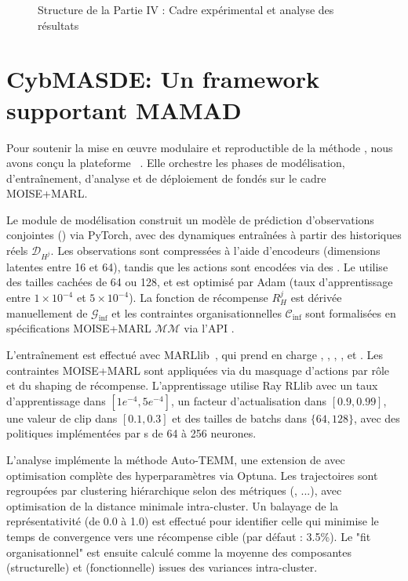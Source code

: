 \begin{figure}[h!]
    \centering
    \resizebox{\linewidth}{!}{%
        
    }
    \caption{Structure de la Partie IV : Cadre expérimental et analyse des résultats}
    \label{fig:organisation_manuscrit_partie_4}
\end{figure}

\chapter{CybMASDE: Un framework supportant MAMAD}
\label{sec:cybmasde}

Pour soutenir la mise en œuvre modulaire et reproductible de la méthode , nous avons conçu la plateforme ~\footnotemark[1]. Elle orchestre les phases de modélisation, d'entraînement, d'analyse et de déploiement de  fondés sur le cadre MOISE+MARL.


Le module de modélisation construit un modèle de prédiction d'observations conjointes () via PyTorch, avec des dynamiques  entraînées à partir des historiques réels $\mathcal{D}_{H^j}$. Les observations sont compressées à l'aide d'encodeurs  (dimensions latentes entre 16 et 64), tandis que les actions sont encodées via des . Le  utilise des tailles cachées de 64 ou 128, et est optimisé par Adam (taux d'apprentissage entre $1 \times 10^{-4}$ et $5 \times 10^{-4}$). La fonction de récompense $R^j_H$ est dérivée manuellement de $\mathcal{G}_{\text{inf}}$ et les contraintes organisationnelles $\mathcal{C}_{\text{inf}}$ sont formalisées en spécifications MOISE+MARL $\mathcal{MM}$ via l'API .

L'entraînement est effectué avec MARLlib~\cite{hu2022marllib}, qui prend en charge , , , ,  et . Les contraintes MOISE+MARL sont appliquées via du masquage d'actions par rôle et du shaping de récompense. L'apprentissage utilise Ray RLlib avec un taux d'apprentissage dans $[1e^{-4}, 5e^{-4}]$, un facteur d'actualisation dans $[0.9, 0.99]$, une valeur de clip  dans $[0.1, 0.3]$ et des tailles de batchs dans $\{64, 128\}$, avec des politiques implémentées par s de 64 à 256 neurones.

L'analyse implémente la méthode Auto-TEMM, une extension de  avec optimisation complète des hyperparamètres via Optuna. Les trajectoires sont regroupées par clustering hiérarchique selon des métriques (, ...), avec optimisation de la distance minimale intra-cluster. Un balayage de la représentativité (de 0.0 à 1.0) est effectué pour identifier celle qui minimise le temps de convergence vers une récompense cible (par défaut : 3.5\%). Le "fit organisationnel" est ensuite calculé comme la moyenne des composantes  (structurelle) et  (fonctionnelle) issues des variances intra-cluster.

